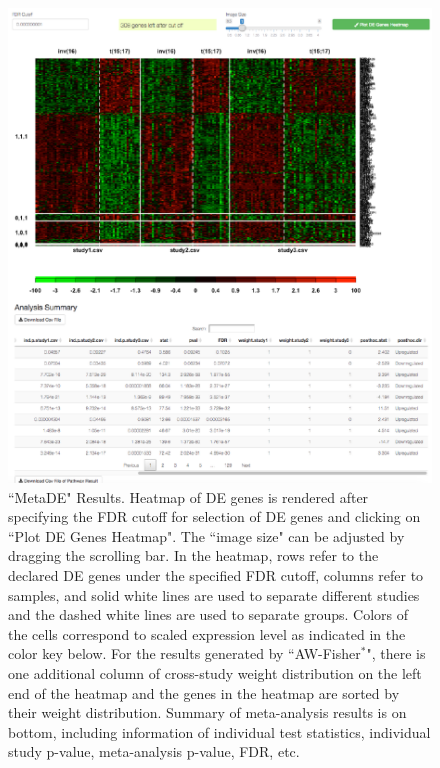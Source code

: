 \begin{figure}[H]
\begin{center}
\includegraphics[scale=1]{./figure/metaDE/metaDEresult.pdf}
\caption{``MetaDE" Results.
Heatmap of DE genes is rendered after specifying the FDR cutoff for selection of DE genes and clicking on ``Plot DE Genes Heatmap". 
The ``image size" can be adjusted by dragging the scrolling bar. 
In the heatmap, rows refer to the declared DE genes under the specified FDR cutoff, 
columns refer to samples, and solid white lines are used to separate different studies and the dashed white lines are used to separate groups. 
Colors of the cells correspond to scaled expression level as indicated in the color key below. 
For the results generated by ``AW-Fisher$^{\ast}$", there is one additional column of cross-study weight distribution on the left end of the heatmap and the genes in the heatmap are sorted by their weight distribution.
Summary of meta-analysis results is on bottom, 
including information of individual test statistics, individual study p-value, meta-analysis p-value, FDR, etc. 
}
\label{fig:MetaDEresult1}
\end{center}
\end{figure}

